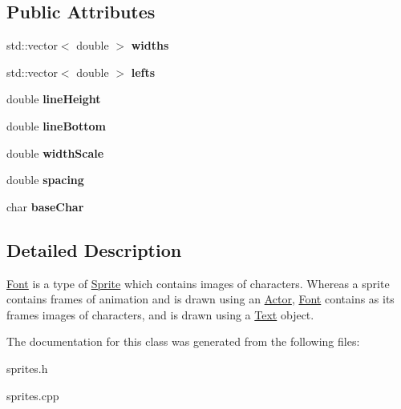 \subsection*{Public Attributes}
\begin{DoxyCompactItemize}
\item 
\hypertarget{classg2c_1_1_font_ad5ebe530ff4f227a19f8ca1efb2103b3}{
std::vector$<$ double $>$ {\bfseries widths}}
\label{classg2c_1_1_font_ad5ebe530ff4f227a19f8ca1efb2103b3}

\item 
\hypertarget{classg2c_1_1_font_a19fd7b96afc081f6ce2d1d56e7704586}{
std::vector$<$ double $>$ {\bfseries lefts}}
\label{classg2c_1_1_font_a19fd7b96afc081f6ce2d1d56e7704586}

\item 
\hypertarget{classg2c_1_1_font_ae29b567190687d5be84898462871671b}{
double {\bfseries lineHeight}}
\label{classg2c_1_1_font_ae29b567190687d5be84898462871671b}

\item 
\hypertarget{classg2c_1_1_font_ace21eb427461d59c70ca4bdb3b64bbde}{
double {\bfseries lineBottom}}
\label{classg2c_1_1_font_ace21eb427461d59c70ca4bdb3b64bbde}

\item 
\hypertarget{classg2c_1_1_font_acb98fb00e0258413c689721b26f511d9}{
double {\bfseries widthScale}}
\label{classg2c_1_1_font_acb98fb00e0258413c689721b26f511d9}

\item 
\hypertarget{classg2c_1_1_font_ae3f4396bdc9acee5681e2cee879106e9}{
double {\bfseries spacing}}
\label{classg2c_1_1_font_ae3f4396bdc9acee5681e2cee879106e9}

\item 
\hypertarget{classg2c_1_1_font_a27b77d89290e4bc1eee4d34edd152b8d}{
char {\bfseries baseChar}}
\label{classg2c_1_1_font_a27b77d89290e4bc1eee4d34edd152b8d}

\end{DoxyCompactItemize}


\subsection{Detailed Description}
\hyperlink{classg2c_1_1_font}{Font} is a type of \hyperlink{classg2c_1_1_sprite}{Sprite} which contains images of characters. Whereas a sprite contains frames of animation and is drawn using an \hyperlink{classg2c_1_1_actor}{Actor}, \hyperlink{classg2c_1_1_font}{Font} contains as its frames images of characters, and is drawn using a \hyperlink{classg2c_1_1_text}{Text} object. 

The documentation for this class was generated from the following files:\begin{DoxyCompactItemize}
\item 
sprites.h\item 
sprites.cpp\end{DoxyCompactItemize}
